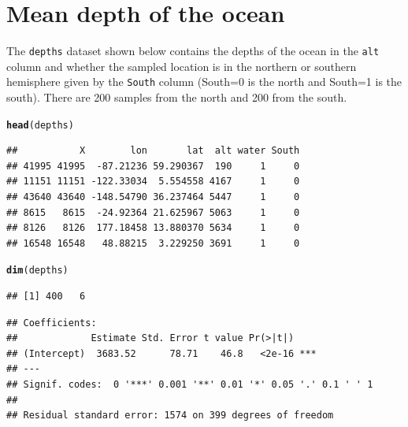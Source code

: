 \documentclass[landscape,twocolumn,letterpaper,9pt,reqno]{article}\usepackage[]{graphicx}\usepackage[]{color}
\newcommand{\hlstd}[1]{\textcolor[rgb]{0.345,0.345,0.345}{#1}}%
\newcommand{\hlkwd}[1]{\textcolor[rgb]{0.737,0.353,0.396}{\textbf{#1}}}%
\newenvironment{knitrout}{}{} %
\begin{document}
	



\section{Mean depth of the ocean}




The \texttt{depths} dataset shown below contains the depths of the ocean in the \texttt{alt} column and whether the sampled location is in the northern or southern hemisphere given by the \texttt{South} column (South=0 is the north and South=1 is the south). There are 200 samples from the north and 200 from the south. 

\begin{knitrout}
\color{fgcolor}
\begin{alltt}
\hlkwd{head}\hlstd{(depths)}
\end{alltt}
\begin{verbatim}
##           X        lon       lat  alt water South
## 41995 41995  -87.21236 59.290367  190     1     0
## 11151 11151 -122.33034  5.554558 4167     1     0
## 43640 43640 -148.54790 36.237464 5447     1     0
## 8615   8615  -24.92364 21.625967 5063     1     0
## 8126   8126  177.18458 13.880370 5634     1     0
## 16548 16548   48.88215  3.229250 3691     1     0
\end{verbatim}
\begin{alltt}
\hlkwd{dim}\hlstd{(depths)}
\end{alltt}
\begin{verbatim}
## [1] 400   6
\end{verbatim}

\end{knitrout}

\begin{knitrout}
\color{fgcolor}
\begin{verbatim}
## Coefficients:
##             Estimate Std. Error t value Pr(>|t|)    
## (Intercept)  3683.52      78.71    46.8   <2e-16 ***
## ---
## Signif. codes:  0 '***' 0.001 '**' 0.01 '*' 0.05 '.' 0.1 ' ' 1
## 
## Residual standard error: 1574 on 399 degrees of freedom
\end{verbatim}

\end{knitrout}
\end{document}
